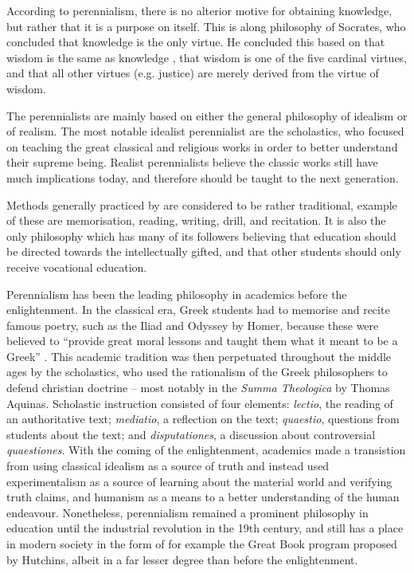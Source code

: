 According to perennialism, there is no alterior motive for obtaining knowledge, but rather that it is a purpose on itself. This is along philosophy of Socrates, who concluded that knowledge is the only virtue. He concluded this based on that wisdom is the same as knowledge \cite{wisdomknowledge}, that wisdom is one of the five cardinal virtues, and that all other virtues (e.g. justice) are merely derived from the virtue of wisdom.

The perennialists are mainly based on either the general philosophy of idealism or of realism. The most notable idealist perennialist are the scholastics, who focused on teaching the great classical and religious works in order to better understand their supreme being. Realist perennialists believe the classic works still have much implications today, and therefore should be taught to the next generation.

Methods generally practiced by are considered to be rather traditional, example of these are memorisation, reading, writing, drill, and recitation. It is also the only philosophy which has many of its followers believing that education should be directed towards the intellectually gifted, and that other students should only receive vocational education.

Perennialism has been the leading philosophy in academics before the enlightenment. In the classical era, Greek students had to memorise and recite famous poetry, such as the Iliad and Odyssey by Homer, because these were believed to ``provide great moral lessons and taught them what it meant to be a Greek'' \cite[p.139]{searchgreeks}. This academic tradition was then perpetuated throughout the middle ages by the scholastics, who used the rationalism of the Greek philosophers to defend christian doctrine -- most notably in the \emph{Summa Theologica} by Thomas Aquinas. Scholastic instruction consisted of four elements: \emph{lectio}, the reading of an authoritative text; \emph{mediatio}, a reflection on the text; \emph{quaestio}, questions from students about the text; and \emph{disputationes}, a discussion about controversial \emph{quaestiones}. With the coming of the enlightenment, academics made a transistion from using classical idealism as a source of truth and instead used experimentalism as a source of learning about the material world and verifying truth claims, and humanism as a means to a better understanding of the human endeavour. Nonetheless, perennialism remained a prominent philosophy in education until the industrial revolution in the 19th century, and still has a place in modern society in the form of for example the Great Book program proposed by Hutchins, albeit in a far lesser degree than before the enlightenment.

